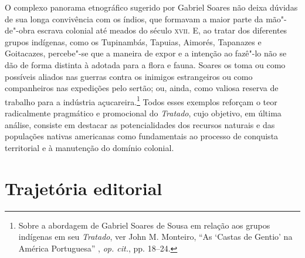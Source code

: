 O complexo panorama etnográfico sugerido por Gabriel Soares não deixa
dúvidas de sua longa convivência com os índios, que formavam a maior
parte da mão"-de"-obra escrava colonial até meados do século \textsc{xvii}. E, ao
tratar dos diferentes grupos indígenas, como os Tupinambás, Tapuias,
Aimorés, Tapanazes e Goitacazes, percebe"-se que a maneira de expor e a
intenção ao fazê"-lo não se dão de forma distinta à adotada para a flora
e fauna.  Soares os toma ou como possíveis aliados nas guerras contra
os inimigos estrangeiros ou como companheiros nas expedições pelo
sertão; ou, ainda, como valiosa reserva de trabalho para a indústria
açucareira.\footnote{ Sobre a abordagem de Gabriel Soares de Sousa em
relação aos grupos indígenas em seu \textit{Tratado}, ver John M.
Monteiro, ``As ‘Castas de Gentio’ na América Portuguesa'' ,
\textit{op. cit.}, pp. 18--24.} Todos esses exemplos reforçam o teor
radicalmente pragmático e promocional do \textit{Tratado}, cujo
objetivo, em última análise, consiste em destacar as potencialidades
dos recursos naturais e das populações nativas americanas como
fundamentais ao processo de conquista territorial e à manutenção do domínio colonial.

\section{Trajetória editorial}

